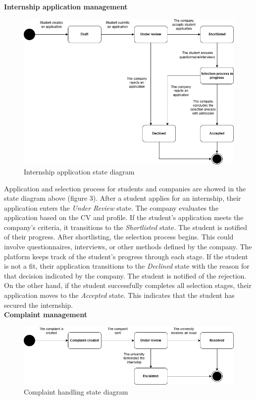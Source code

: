 \newpage
\textbf{Internship application management}\\
\begin{figure}[H]
	\includegraphics[width=\textwidth,height=\textheight,keepaspectratio]{RASD-Latex/assets/state_diagram_2.png}
	\caption{Internship application state diagram}
	\label{fig:DataRequest}
\end{figure}

Application and selection process for students and companies are showed in the state diagram above (figure 3). After a student applies for an internship, their application enters the \textit{Under Review} state. The company evaluates the application based on the CV and profile. If the student’s application meets the company’s criteria, it transitions to the \textit{Shortlisted} state. The student is notified of their progress. After shortlisting, the selection process begins. This could involve questionnaires, interviews, or other methods defined by the company. The platform keeps track of the student's progress through each stage. If the student is not a fit, their application transitions to the \textit{Declined} state with the reason for that decision indicated by the company. The student is notified of the rejection. On the other hand, if the student successfully completes all selection stages, their application moves to the \textit{Accepted} state. This indicates that the student has secured the internship. \\

\newpage
\textbf{Complaint management}\\
\begin{figure}[H]
	\includegraphics[width=\textwidth,height=\textheight,keepaspectratio]{RASD-Latex/assets/state_diagram_3.png}
	\caption{Complaint handling state diagram}
	\label{fig:DataRequest}
\end{figure}

